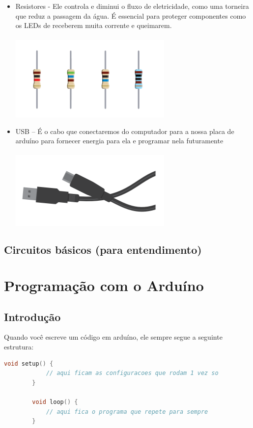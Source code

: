 \documentclass{report}
\begin{document}
\begin{itemize}
		\item Resistores - Ele controla e diminui o fluxo de eletricidade, como uma torneira que reduz a passagem da água. É essencial para proteger componentes como os LEDs de receberem muita corrente e queimarem.\\ \\
		\includegraphics[width=8cm]{imagens/resistores.png}
		
		\item USB – É o cabo que conectaremos do computador para a nossa placa de arduíno para fornecer energia para ela e programar nela futuramente  \\ \\
		\includegraphics[width=8cm]{imagens/usb.png}
	\end{itemize}
	
	\section{Circuitos básicos (para entendimento)}
	
	\chapter{Programação com o Arduíno}
	\section{Introdução}
	
	
	Quando você escreve um código em arduíno, ele sempre segue a seguinte estrutura:
	
	
	\begin{lstlisting}[language=C++]
		void setup() {
			// aqui ficam as configuracoes que rodam 1 vez so
		}
		
		void loop() {
			// aqui fica o programa que repete para sempre
		}
		
	\end{lstlisting}
	
\end{document}
